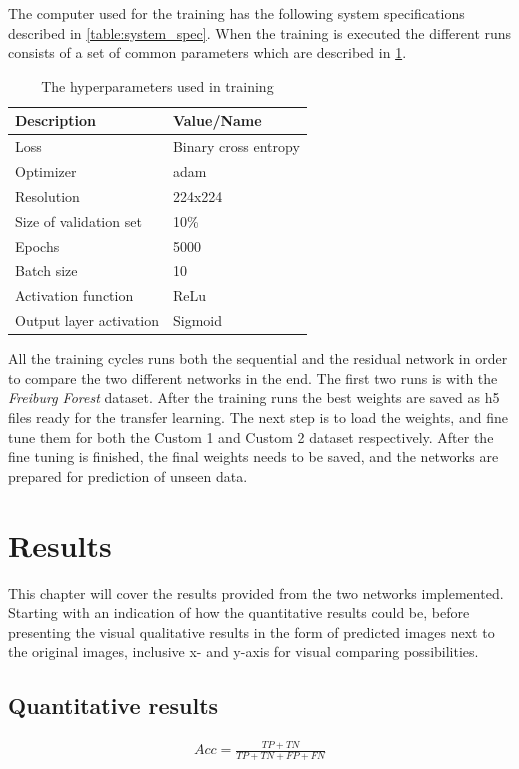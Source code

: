 \documentclass[USenglish]{ifimaster}  %
\begin{document}
The computer used for the training has the following system specifications described in \cref{table:system_spec}.
When the training is executed the different runs consists of a set of common parameters which are described in \cref{table:hyperparameters}. 

\begin{table}[ht]
\centering
\begin{tabular}{ll}
\hline
\textbf{Description} & \textbf{Value/Name}  \\ \hline
Loss &  Binary cross entropy\\
Optimizer &  adam \\
Resolution & 224x224 \\
Size of validation set & 10\%  \\
Epochs &  5000 \\ 
Batch size & 10\\
Activation function & ReLu\\
Output layer activation & Sigmoid \\ \hline
\end{tabular}
\caption{The hyperparameters used in training}
\label{table:hyperparameters}
\end{table}
All the training cycles runs both the sequential and the residual network in order to compare the two different networks in the end. The first two runs is with the \textit{Freiburg Forest} dataset. After the training runs the best weights are saved as h5 files ready for the transfer learning. The next step is to load the weights, and fine tune them for both the Custom 1 and Custom 2 dataset respectively. After the fine tuning is finished, the final weights needs to be saved, and the networks are prepared for prediction of unseen data.    

\chapter{Results} 
This chapter will cover the results provided from the two networks implemented. Starting with an indication of how the quantitative results could be, before presenting the visual qualitative results in the form of predicted images next to the original images, inclusive x- and y-axis for visual comparing possibilities. 
\section{Quantitative results}

\begin{equation}\label{eq:accuracy}
\begin{aligned}
Acc = \frac{TP + TN}{TP + TN + FP + FN}
\end{aligned}
\end{equation}
\end{document}
